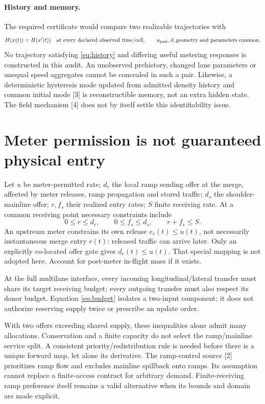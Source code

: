 \documentclass[10pt,a4paper]{article}
\begin{document}
\paragraph{History and memory.}
The required certificate would compare two realizable trajectories with
\begin{equation}
 H(x(t))=H(x'(t))\quad\text{at every declared observed time/cell},
 \qquad u_{\rm past},d,\text{geometry and parameters common}. \label{eq:history}
\end{equation}
No trajectory satisfying \eqref{eq:history} and differing useful metering
responses is constructed in this audit. An unobserved prehistory, changed lane
parameters or unequal speed aggregates cannot be concealed in such a pair.
Likewise, a deterministic hysteresis mode updated from admitted density history
and common initial mode [3] is reconstructible memory, not an extra hidden state.
The field mechanism [4] does not by itself settle this identifiability issue.

\section{Meter permission is not guaranteed physical entry}
Let $u$ be meter-permitted rate; $d_r$ the local ramp sending offer at the merge,
affected by meter releases, ramp propagation and stored traffic; $d_s$ the
shoulder-mainline offer; $r,f_s$ their realized entry rates; $S$ finite
receiving rate. At a common receiving point necessary constraints include
\begin{equation}
 0\le r\le d_r,\qquad 0\le f_s\le d_s,\qquad r+f_s\le S.
 \label{eq:budget}
\end{equation}
An upstream meter constrains its own release $e_r(t)\le u(t)$, not necessarily
instantaneous merge entry $r(t)$: released traffic can arrive later. Only an
explicitly co-located offer gate gives $d_r(t)\le u(t)$. That special mapping is
not adopted here. Account for post-meter in-flight mass if it exists.

At the full multilane interface, every incoming longitudinal/lateral transfer
must share its target receiving budget; every outgoing transfer must also respect
its donor budget. Equation \eqref{eq:budget} isolates a two-input component;
it does not authorize reserving supply twice or prescribe an update order.

With two offers exceeding shared supply, these inequalities alone admit many
allocations. Conservation and a finite capacity do not select the ramp/mainline
service split. A consistent priority/redistribution rule is needed before
there is a unique forward map, let alone its derivative. The ramp-control
source [2] prioritizes ramp flow and excludes mainline spillback onto ramps.
Its assumption cannot replace a finite-access contract for arbitrary demand.
Finite-receiving ramp preference itself remains a valid alternative when its
bounds and domain are made explicit.
\end{document}
